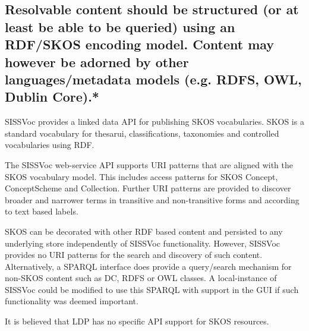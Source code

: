 \documentclass[10pt,a4paper]{article}
\begin{document}
\begin{flushleft}
\subsection{Resolvable content should be structured (or at least be able to be queried)
  using an RDF/SKOS encoding model. Content may however be adorned by other
  languages/metadata models (e.g. RDFS, OWL, Dublin Core).* }

  \item SISSVoc provides a linked data API for publishing SKOS vocabularies. SKOS
  is a standard vocabulary for thesarui, classifications, taxonomies and
controlled vocabularies using RDF.

   \item  The SISSVoc web-service API supports URI patterns that are aligned with the SKOS
  vocabulary model. This includes access patterns for SKOS Concept,
  ConceptScheme and Collection. Further URI patterns are provided to discover
  broader and narrower terms in transitive and non-transitive forms and according
  to text based labels. 

     \item SKOS can be decorated with other RDF based content and persisted to
  any underlying store independently of SISSVoc
  functionality. However, SISSVoc provides no URI patterns for the
  search and discovery of such content. Alternatively, a SPARQL interface
  does provide a query/search mechanism for non-SKOS content such as DC, RDFS or
  OWL classes. A local-instance of SISSVoc could be modified to use this SPARQL
  with support in the GUI if such functionality was deemed important. 

  \item It is believed that LDP has no specific API support for SKOS resources.

% 
% 
% 


\end{flushleft}
\end{document}
